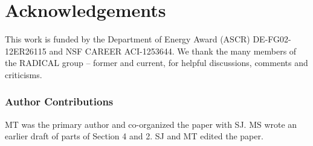 \documentclass{sig-alternate}
\begin{document}



%

%

%
\section*{Acknowledgements}

{\footnotesize{This work is funded by the Department of Energy Award (ASCR)
DE-FG02-12ER26115 and NSF CAREER ACI-1253644. We thank the many members of the
RADICAL group -- former and current, for helpful discussions, comments and
criticisms.}}

\subsubsection*{Author Contributions} MT was the primary author and
co-organized the paper with SJ. MS wrote an earlier draft of parts of Section 4
and 2.  SJ and MT edited the paper.



%


\end{document}
